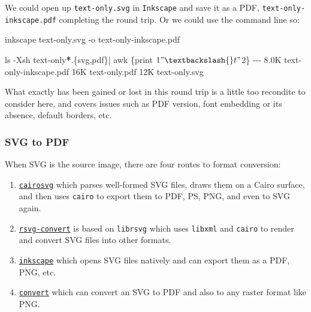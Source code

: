 \documentclass[
  11pt,
  british,
  a4paper,
]{article}
\newenvironment{Shaded}{\begin{snugshade}}{\end{snugshade}}
\newcommand{\AttributeTok}[1]{\textcolor[rgb]{0.80,0.80,0.80}{#1}}
\newcommand{\DataTypeTok}[1]{\textcolor[rgb]{0.87,0.87,0.75}{#1}}
\newcommand{\ExtensionTok}[1]{\textcolor[rgb]{0.80,0.80,0.80}{#1}}
\newcommand{\FunctionTok}[1]{\textcolor[rgb]{0.94,0.94,0.56}{#1}}
\newcommand{\KeywordTok}[1]{\textcolor[rgb]{0.94,0.87,0.69}{#1}}
\newcommand{\NormalTok}[1]{\textcolor[rgb]{0.80,0.80,0.80}{#1}}
\newcommand{\OperatorTok}[1]{\textcolor[rgb]{0.94,0.94,0.82}{#1}}
\newcommand{\PreprocessorTok}[1]{\textcolor[rgb]{1.00,0.81,0.69}{\textbf{#1}}}
\newcommand{\StringTok}[1]{\textcolor[rgb]{0.80,0.58,0.58}{#1}}
\begin{document}
We could open up \texttt{text-only.svg} in \texttt{Inkscape} and save it
as a PDF, \texttt{text-only-inkscape.pdf} completing the round trip. Or
we could use the command line so:

\begin{Shaded}
\begin{Highlighting}[]
\ExtensionTok{inkscape}\NormalTok{ text{-}only.svg }\AttributeTok{{-}o}\NormalTok{ text{-}only{-}inkscape.pdf}

\FunctionTok{ls} \AttributeTok{{-}Xsh}\NormalTok{ text{-}only}\PreprocessorTok{*}\NormalTok{.}\DataTypeTok{\{svg}\OperatorTok{,}\DataTypeTok{pdf\}}\KeywordTok{|} \FunctionTok{awk} \StringTok{\textquotesingle{}\{print $1 "\textbackslash{}t" $2\}\textquotesingle{}}
\ExtensionTok{{-}{-}{-}}
\ExtensionTok{8.0K}\NormalTok{    text{-}only{-}inkscape.pdf}
\ExtensionTok{16K}\NormalTok{     text{-}only.pdf}
\ExtensionTok{12K}\NormalTok{     text{-}only.svg}
\end{Highlighting}
\end{Shaded}

What exactly has been gained or lost in this round trip is a little too
recondite to consider here, and covers issues such as PDF version, font
embedding or its absence, default borders, etc.

\hypertarget{svg-to-pdf}{%
\subsubsection{SVG to PDF}\label{svg-to-pdf}}

When SVG is the source image, there are four routes to format
conversion:

\begin{enumerate}
\item
  \href{https://cairosvg.org/}{\texttt{cairosvg}} which parses
  well-formed SVG files, draws them on a Cairo surface, and then uses
  \texttt{cairo} to export them to PDF, PS, PNG, and even to SVG again.
\item
  \href{https://en.wikipedia.org/wiki/Librsvg}{\texttt{rsvg-convert}} is
  based on \texttt{librsvg} which uses \texttt{libxml} and
  \texttt{cairo} to render and convert SVG files into other formats.
\item
  \href{https://inkscape.org/}{\texttt{inkscape}} which opens SVG files
  natively and can export them as a PDF, PNG, etc.
\item
  \href{https://imagemagick.org/script/convert.php}{\texttt{convert}}
  which can convert an SVG to PDF and also to any raster format like
  PNG.
\end{enumerate}
\end{document}
